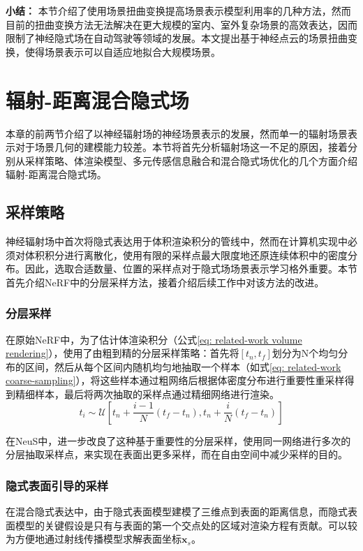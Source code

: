 \noindent\textbf{小结：}
本节介绍了使用场景扭曲变换提高场景表示模型利用率的几种方法，然而目前的扭曲变换方法无法解决在更大规模的室内、室外复杂场景的高效表达，因而限制了神经隐式场在自动驾驶等领域的发展。本文提出基于神经点云的场景扭曲变换，使得场景表示可以自适应地拟合大规模场景。



\section{辐射-距离混合隐式场}
\label{sec: related-work density-distance fields}
本章的前两节介绍了以神经辐射场的神经场景表示的发展，然而单一的辐射场景表示对于场景几何的建模能力较差。本节将首先分析辐射场这一不足的原因，接着分别从采样策略、体渲染模型、多元传感信息融合和混合隐式场优化的几个方面介绍辐射-距离混合隐式场。

\subsection{采样策略}
神经辐射场中首次将隐式表达用于体积渲染积分的管线中，然而在计算机实现中必须对体积积分进行离散化，使用有限的采样点最大限度地还原连续体积中的密度分布。因此，选取合适数量、位置的采样点对于隐式场场景表示学习格外重要。本节首先介绍NeRF\cite{mildenhall_nerf_2020}中的分层采样方法，接着介绍后续工作中对该方法的改进。

\subsubsection{分层采样}
\label{sec: coarse-to-fine sampling}
在原始NeRF中，为了估计体渲染积分（公式\ref{eq: related-work volume rendering}），使用了由粗到精的分层采样策略：首先将$[t_n,t_f]$划分为N个均匀分布的区间，然后从每个区间内随机均匀地抽取一个样本（如式\ref{eq: related-work coarse-sampling}），将这些样本通过粗网络后根据体密度分布进行重要性重采样得到精细样本，最后将两次抽取的采样点通过精细网络进行渲染。
\begin{equation}
    t_i\sim\mathcal{U}\left[t_n+\frac{i-1}{N}(t_f-t_n), t_n+\frac{i}{N}(t_f-t_n)\right]
    \label{eq: related-work coarse-sampling}
\end{equation}

在NeuS\cite{wang_neus_2021}中，进一步改良了这种基于重要性的分层采样，使用同一网络进行多次的分层抽取采样点，来实现在表面出更多采样，而在自由空间中减少采样的目的。


\subsubsection{隐式表面引导的采样}
在混合隐式表达中，由于隐式表面模型建模了三维点到表面的距离信息，而隐式表面模型的关键假设是只有与表面的第一个交点处的区域对渲染方程有贡献。可以较为方便地通过射线传播模型求解表面坐标$\mathbf{x}_s$\cite{niemeyer_differentiable_2020}。

